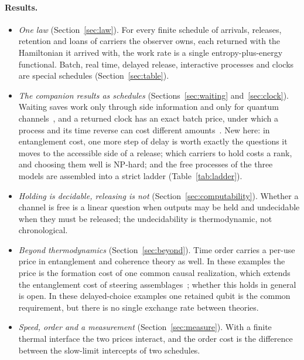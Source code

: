 \documentclass[11pt]{article}
\theoremstyle{definition}
\theoremstyle{remark}
\begin{document}
\paragraph{Results.}
\begin{itemize}[leftmargin=*]
\item \emph{One law} (Section~\ref{sec:law}). For every finite schedule of arrivals, releases, retention and loans of carriers the observer owns, each returned with the Hamiltonian it arrived with, the work rate is a single entropy-plus-energy functional. Batch, real time, delayed release, interactive processes and clocks are special schedules (Section~\ref{sec:table}).
\item \emph{The companion results as schedules} (Sections~\ref{sec:waiting} and~\ref{sec:clock}). Waiting saves work only through side information and only for quantum channels~\cite{SaveWork}, and a returned clock has an exact batch price, under which a process and its time reverse can cost different amounts~\cite{KeepingTime}. New here: in entanglement cost, one more step of delay is worth exactly the questions it moves to the accessible side of a release; which carriers to hold costs a rank, and choosing them well is NP-hard; and the free processes of the three models are assembled into a strict ladder (Table~\ref{tab:ladder}).
\item \emph{Holding is decidable, releasing is not} (Section~\ref{sec:computability}). Whether a channel is free is a linear question when outputs may be held and undecidable when they must be released; the undecidability is thermodynamic, not chronological.
\item \emph{Beyond thermodynamics} (Section~\ref{sec:beyond}). Time order carries a per-use price in entanglement and coherence theory as well. In these examples the price is the formation cost of one common causal realization, which extends the entanglement cost of steering assemblages~\cite{Cope21}; whether this holds in general is open. In these delayed-choice examples one retained qubit is the common requirement, but there is no single exchange rate between theories.
\item \emph{Speed, order and a measurement} (Section~\ref{sec:measure}). With a finite thermal interface the two prices interact, and the order cost is the difference between the slow-limit intercepts of two schedules.
\end{itemize}
\end{document}
